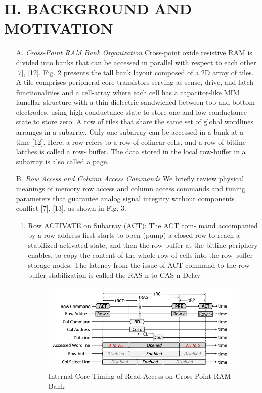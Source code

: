 \documentclass{article}
\begin{document}
 	\section*{II. BACKGROUND AND MOTIVATION}
 		\begin{itemize}
 			\item[A.] \textit{Cross-Point RAM Bank Organization}
 				Cross-point oxide resistive RAM is divided into banks that
 				can be accessed in parallel with respect to each other [7], [12].
 				Fig. 2 presents the tall bank layout composed of a 2D array
 				of tiles. A tile comprises peripheral core transistors serving as
 				sense, drive, and latch functionalities and a cell-array where
 				each cell has a capacitor-like MIM lamellar structure with a
 				thin dielectric sandwiched between top and bottom electrodes,
 				using high-conductance state to store one and low-conductance
 				state to store zero. A row of tiles that share the same set of
 				global wordlines arranges in a subarray. Only one subarray can
 				be accessed in a bank at a time [12]. Here, a row refers to a row
 				of colinear cells, and a row of bitline latches is called a row-
 				buffer. The data stored in the local row-buffer in a subarray is
 				also called a page.
 			
 			\item [B.] \textit{Row Access and Column Access Commands}
 					We briefly review physical meanings of memory row access
 				and column access commands and timing parameters that
 				guarantee analog signal integrity without components conflict
 				[7], [13], as shown in Fig. 3.
 				\begin{enumerate}
 					\item Row ACTIVATE on Subarray (ACT): The ACT com-
 					mand accompanied by a row address first starts to open (pump)
 					a closed row to reach a stabilized activated state, and then
 					the row-buffer at the bitline periphery enables, to copy the
 					content of the whole row of cells into the row-buffer storage
 					nodes. The latency from the issue of ACT command to the
 					row-buffer stabilization is called the RAS n-to-CAS n Delay
 					
 					\begin{figure}
 						\centering
 						\includegraphics[width=0.7\linewidth]{images/fig3}
 						\caption{Internal Core Timing of Read Access on Cross-Point RAM Bank}
 						\label{fig:fig3}
 					\end{figure}
 					

\end{enumerate}
\end{itemize}
\end{document}
